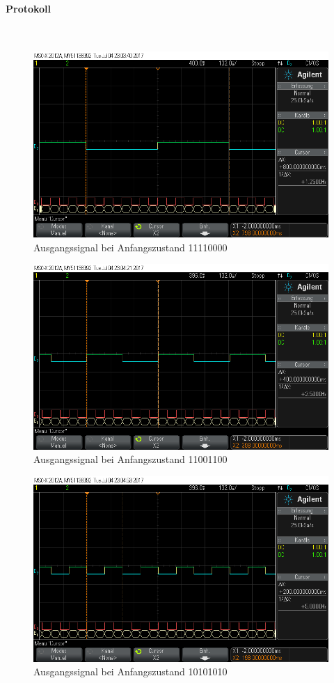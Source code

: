\documentclass[10pt]{scrreprt}
\begin{document}
    \paragraph{Protokoll}
    $ $
    \begin{figure}[H]
        \includegraphics[width=\textwidth]{scope_11.png}
        \caption{Ausgangssignal bei Anfangszustand 11110000}
    \end{figure}
    \begin{figure}[H]
        \includegraphics[width=\textwidth]{scope_12.png}
        \caption{Ausgangssignal bei Anfangszustand 11001100}
    \end{figure}
    \begin{figure}[H]
        \includegraphics[width=\textwidth]{scope_13.png}
        \caption{Ausgangssignal bei Anfangszustand 10101010}
    \end{figure}
\end{document}
